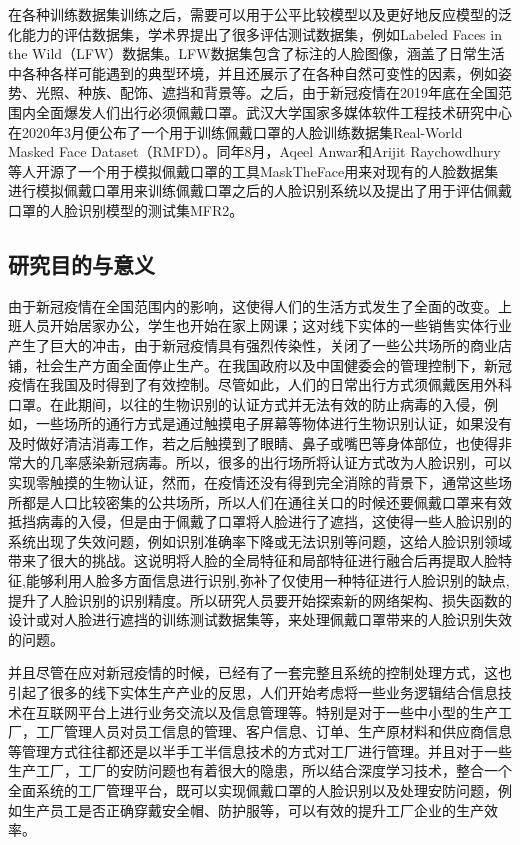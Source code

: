 在各种训练数据集训练之后，需要可以用于公平比较模型以及更好地反应模型的泛化能力的评估数据集，学术界提出了很多评估测试数据集，例如Labeled Faces in the Wild（LFW\cite{lfw}）数据集。LFW数据集包含了标注的人脸图像，涵盖了日常生活中各种各样可能遇到的典型环境，并且还展示了在各种自然可变性的因素，例如姿势、光照、种族、配饰、遮挡和背景等。之后，由于新冠疫情在2019年底在全国范围内全面爆发人们出行必须佩戴口罩。武汉大学国家多媒体软件工程技术研究中心在2020年3月便公布了一个用于训练佩戴口罩的人脸训练数据集Real-World Masked Face Dataset（RMFD\cite{wuhanmasked}）。同年8月，Aqeel Anwar和Arijit Raychowdhury等人开源了一个用于模拟佩戴口罩的工具MaskTheFace\cite{masktheface}用来对现有的人脸数据集进行模拟佩戴口罩用来训练佩戴口罩之后的人脸识别系统以及提出了用于评估佩戴口罩的人脸识别模型的测试集MFR2。

\subsection{研究目的与意义}

由于新冠疫情在全国范围内的影响，这使得人们的生活方式发生了全面的改变。上班人员开始居家办公，学生也开始在家上网课；这对线下实体的一些销售实体行业产生了巨大的冲击，由于新冠疫情具有强烈传染性，关闭了一些公共场所的商业店铺，社会生产方面全面停止生产。在我国政府以及中国健委会的管理控制下，新冠疫情在我国及时得到了有效控制。尽管如此，人们的日常出行方式须佩戴医用外科口罩。在此期间，以往的生物识别的认证方式并无法有效的防止病毒的入侵，例如，一些场所的通行方式是通过触摸电子屏幕等物体进行生物识别认证，如果没有及时做好清洁消毒工作，若之后触摸到了眼睛、鼻子或嘴巴等身体部位，也使得非常大的几率感染新冠病毒。所以，很多的出行场所将认证方式改为人脸识别，可以实现零触摸的生物认证\cite{s3}，然而，在疫情还没有得到完全消除的背景下，通常这些场所都是人口比较密集的公共场所，所以人们在通往关口的时候还要佩戴口罩来有效抵挡病毒的入侵，但是由于佩戴了口罩将人脸进行了遮挡，这使得一些人脸识别的系统出现了失效问题\cite{s1}，例如识别准确率下降或无法识别等问题，这给人脸识别领域带来了很大的挑战。这说明将人脸的全局特征和局部特征进行融合后再提取人脸特征,能够利用人脸多方面信息进行识别,弥补了仅使用一种特征进行人脸识别的缺点,提升了人脸识别的识别精度\cite{s2}。所以研究人员要开始探索新的网络架构、损失函数的设计或对人脸进行遮挡的训练测试数据集等，来处理佩戴口罩带来的人脸识别失效的问题。

并且尽管在应对新冠疫情的时候，已经有了一套完整且系统的控制处理方式，这也引起了很多的线下实体生产产业的反思，人们开始考虑将一些业务逻辑结合信息技术在互联网平台上进行业务交流以及信息管理等。特别是对于一些中小型的生产工厂，工厂管理人员对员工信息的管理、客户信息、订单、生产原材料和供应商信息等管理方式往往都还是以半手工半信息技术的方式对工厂进行管理。并且对于一些生产工厂，工厂的安防问题也有着很大的隐患，所以结合深度学习技术，整合一个全面系统的工厂管理平台，既可以实现佩戴口罩的人脸识别以及处理安防问题，例如生产员工是否正确穿戴安全帽、防护服等，可以有效的提升工厂企业的生产效率。

